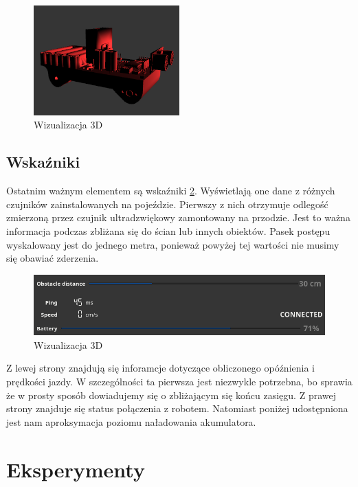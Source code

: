 \documentclass[12pt,a4paper,polish]{article}
\begin{document}
  \begin{figure}[h]
    \centering
    \includegraphics[width=0.5\textwidth]{img/final/3d.png}
    \caption{Wizualizacja 3D}
    \label{fig:3d}
  \end{figure}


  \subsection{Wskaźniki}
  Ostatnim ważnym elementem są wskaźniki \ref{fig:indications}. Wyświetlają one dane z różnych
  czujników zainstalowanych na pojeździe. Pierwszy z nich otrzymuje odlegość
  zmierzoną przez czujnik ultradzwiękowy zamontowany na przodzie. Jest to 
  ważna informacja podczas zbliżana się do ścian lub innych obiektów.
  Pasek postępu wyskalowany jest do jednego metra, ponieważ powyżej tej 
  wartości nie musimy się obawiać zderzenia.

  \begin{figure}[h]
    \centering
    \includegraphics[width=1\textwidth]{img/final/wska.png}
    \caption{Wizualizacja 3D}
    \label{fig:indications}
  \end{figure}

  Z lewej strony znajdują się inforamcje dotyczące obliczonego opóźnienia i
  prędkości jazdy. W szczególności ta pierwsza jest niezwykle potrzebna, bo
  sprawia że w prosty sposób dowiadujemy się o zbliżającym się końcu zasięgu.
  Z prawej strony znajduje się status połączenia z robotem. Natomiast poniżej
  udostępniona jest nam aproksymacja poziomu naładowania akumulatora.


  \section{Eksperymenty}
\end{document}
